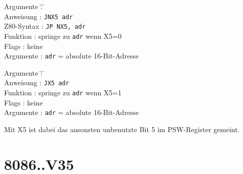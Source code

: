 \documentclass[12pt,a4paper,twoside]{report}
\newcommand{\tty}[1]{{\tt #1}}
\begin{document}
\begin{tabbing}
Argumente         \= : \= \kill \\
Anweisung         \> : \> \tty{JNX5 adr} \\
Z80-Syntax        \> : \> \tty{JP NX5, adr} \\
Funktion          \> : \> springe zu {\tt adr} wenn X5=0 \\
Flags             \> : \> keine \\
Argumente         \> : \> {\tt adr} = absolute 16-Bit-Adresse \\
\end{tabbing}

\begin{tabbing}
Argumente         \= : \= \kill \\
Anweisung         \> : \> \tty{JX5 adr} \\
Funktion          \> : \> springe zu {\tt adr} wenn X5=1 \\
Flags             \> : \> keine \\
Argumente         \> : \> {\tt adr} = absolute 16-Bit-Adresse \\
\end{tabbing}

Mit X5 ist dabei das ansonsten unbenutzte Bit 5 im PSW-Register gemeint.


\section{8086..V35}
\end{document}
